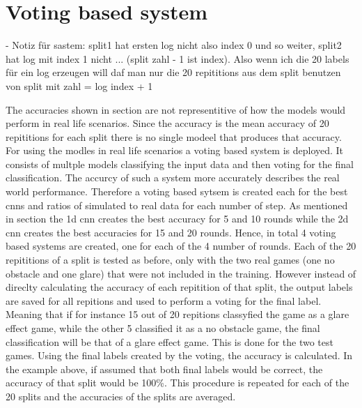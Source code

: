 \chapter{Voting based system}

- Notiz für sastem: split1 hat ersten log nicht also index 0 und so weiter, split2 hat log mit index 1 nicht ... (split zahl - 1 ist index). Also wenn ich die 20 labels für ein log erzeugen will daf man nur die 20 repititions aus dem split benutzen von split mit zahl = log index + 1




The accuracies shown in section  are not representitive of how the models would perform in real life scenarios. Since the accuracy is the mean accuracy of 20 repititions for each split there is no single modeel that produces that accuracy. For using the modles in real life scenarios a voting based system is deployed. It consists of multple models classifying the input data and then voting for the final classification. The accurcy of such a system more accurately describes the real world performance. Therefore a voting based sytsem is created each for the best cnns and ratios of simulated to real data for each number of step. As mentioned in section  the 1d cnn creates the best accuracy for 5 and 10 rounds while the 2d cnn creates the best accuracies for 15 and 20 rounds. Hence, in total 4 voting based systems are created, one for each of the 4 number of rounds.  Each of the 20 repititions of a split is tested as before, only with the two real games (one no obstacle and one glare) that were not included in the training. However instead of direclty calculating the accuracy of each repitition of that split, the output labels are saved for all repitions and used to perform a voting for the final label. Meaning that if for instance 15 out of 20 repitions classyfied the game as a glare effect game, while the other 5 classified it as a no obstacle game, the final classification will be that of a glare effect game. This is done for the two test games. Using the final labels created by the voting, the accuracy is calculated. In the example above, if assumed that both final labels would be correct, the accuracy of that split would be 100\%. This procedure is repeated for each of the 20 splits and the accuracies of the splits are averaged. 

